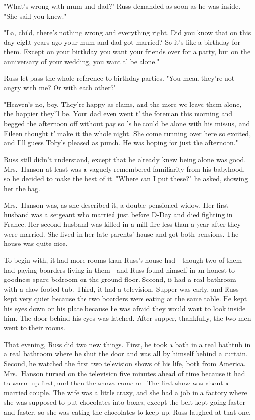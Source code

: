 "What's wrong with mum and dad?" Russ demanded as soon as he was inside. "She said you knew."

"La, child, there's nothing wrong and everything right. Did you know that on this day eight years ago your mum and dad got married? So it's like a birthday for them. Except on your birthday you want your friends over for a party, but on the anniversary of your wedding, you want t' be alone."

Russ let pass the whole reference to birthday parties. "You mean they're not angry with me? Or with each other?"

"Heaven's no, boy. They're happy as clams, and the more we leave them alone, the happier they'll be. Your dad even went t' the foreman this morning and begged the afternoon off without pay so 's he could be alone with his missus, and Eileen thought t' make it the whole night. She come running over here so excited, and I'll guess Toby's pleased as punch. He was hoping for just the afternoon."

Russ still didn't understand, except that he already knew being alone was good. Mrs.~Hanson at least was a vaguely remembered familiarity from his babyhood, so he decided to make the best of it. "Where can I put these?" he asked, showing her the bag.

Mrs.~Hanson was, as she described it, a double-pensioned widow. Her first husband was a sergeant who married just before D-Day and died fighting in France. Her second husband was killed in a mill fire less than a year after they were married. She lived in her late parents' house and got both pensions. The house was quite nice.

To begin with, it had more rooms than Russ's house had—though two of them had paying boarders living in them—and Russ found himself in an honest-to-goodness spare bedroom on the ground floor. Second, it had a real bathroom with a claw-footed tub. Third, it had a television. Supper was early, and Russ kept very quiet because the two boarders were eating at the same table. He kept his eyes down on his plate because he was afraid they would want to look inside him. The door behind his eyes was latched. After supper, thankfully, the two men went to their rooms.

That evening, Russ did two new things. First, he took a bath in a real bathtub in a real bathroom where he shut the door and was all by himself behind a curtain. Second, he watched the first two television shows of his life, both from America. Mrs.~Hanson turned on the television five minutes ahead of time because it had to warm up first, and then the shows came on. The first show was about a married couple. The wife was a little crazy, and she had a job in a factory where she was supposed to put chocolates into boxes, except the belt kept going faster and faster, so she was eating the chocolates to keep up. Russ laughed at that one.

